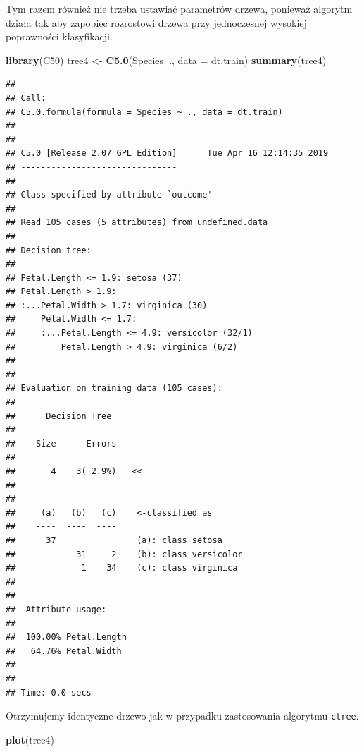 \documentclass[]{book}
\newenvironment{Shaded}{\begin{snugshade}}{\end{snugshade}}
\newcommand{\DataTypeTok}[1]{\textcolor[rgb]{0.13,0.29,0.53}{#1}}
\newcommand{\KeywordTok}[1]{\textcolor[rgb]{0.13,0.29,0.53}{\textbf{#1}}}
\newcommand{\NormalTok}[1]{#1}
\newcommand{\OperatorTok}[1]{\textcolor[rgb]{0.81,0.36,0.00}{\textbf{#1}}}
\newcommand{\StringTok}[1]{\textcolor[rgb]{0.31,0.60,0.02}{#1}}
\theoremstyle{plain}
\theoremstyle{definition}
\theoremstyle{definition}
\theoremstyle{definition}
\theoremstyle{definition}
\theoremstyle{remark}
\begin{document}
Tym razem również nie trzeba ustawiać parametrów drzewa, ponieważ algorytm działa tak aby zapobiec rozrostowi drzewa przy jednoczesnej wysokiej poprawności klasyfikacji.

\begin{Shaded}
\begin{Highlighting}[]
\KeywordTok{library}\NormalTok{(C50)}
\NormalTok{tree4 <-}\StringTok{ }\KeywordTok{C5.0}\NormalTok{(Species}\OperatorTok{~}\NormalTok{., }\DataTypeTok{data =}\NormalTok{ dt.train)}
\KeywordTok{summary}\NormalTok{(tree4)}
\end{Highlighting}
\end{Shaded}

\begin{verbatim}
## 
## Call:
## C5.0.formula(formula = Species ~ ., data = dt.train)
## 
## 
## C5.0 [Release 2.07 GPL Edition]      Tue Apr 16 12:14:35 2019
## -------------------------------
## 
## Class specified by attribute `outcome'
## 
## Read 105 cases (5 attributes) from undefined.data
## 
## Decision tree:
## 
## Petal.Length <= 1.9: setosa (37)
## Petal.Length > 1.9:
## :...Petal.Width > 1.7: virginica (30)
##     Petal.Width <= 1.7:
##     :...Petal.Length <= 4.9: versicolor (32/1)
##         Petal.Length > 4.9: virginica (6/2)
## 
## 
## Evaluation on training data (105 cases):
## 
##      Decision Tree   
##    ----------------  
##    Size      Errors  
## 
##       4    3( 2.9%)   <<
## 
## 
##     (a)   (b)   (c)    <-classified as
##    ----  ----  ----
##      37                (a): class setosa
##            31     2    (b): class versicolor
##             1    34    (c): class virginica
## 
## 
##  Attribute usage:
## 
##  100.00% Petal.Length
##   64.76% Petal.Width
## 
## 
## Time: 0.0 secs
\end{verbatim}

Otrzymujemy identyczne drzewo jak w przypadku zastosowania algorytmu \texttt{ctree}.

\begin{Shaded}
\begin{Highlighting}[]
\KeywordTok{plot}\NormalTok{(tree4)}
\end{Highlighting}
\end{Shaded}
\end{document}
